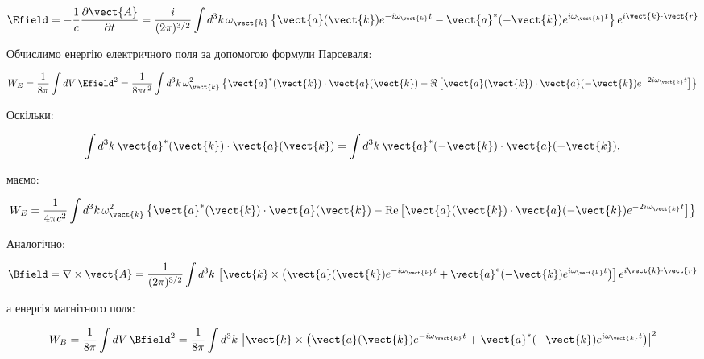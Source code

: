 \begin{equation}
\Efield = -\frac{1}{c} \frac{\partial \vect{A}}{\partial t} = \frac{i}{(2\pi)^{3/2}} \int d^3k \, \omega_{\vect{k}} \left\{ \vect{a}(\vect{k})
e^{-i\omega_{\vect{k}} t} - \vect{a}^*(-\vect{k}) e^{i\omega_{\vect{k}} t} \right\} e^{i\vect{k} \cdot \vect{r}}
\label{eq:E_field_fourier}
\end{equation}

Обчислимо енергію електричного поля за допомогою формули Парсеваля:

\begin{equation}
W_E = \frac{1}{8\pi} \int dV \, \Efield^2 = \frac{1}{8\pi c^2} \int d^3k \, \omega_{\vect{k}}^2 \left\{ \vect{a}^*(\vect{k}) \cdot \vect{a}(\vect{k}) -
\Re \left[ \vect{a}(\vect{k}) \cdot \vect{a}(-\vect{k}) e^{-2i\omega_{\vect{k}} t} \right] \right\}
\label{eq:W_E}
\end{equation}

Оскільки:

\begin{equation*}
\int d^3k \, \vect{a}^*(\vect{k}) \cdot \vect{a}(\vect{k}) = \int d^3k \, \vect{a}^*(-\vect{k}) \cdot \vect{a}(-\vect{k}),
\end{equation*}

маємо:

\begin{equation}
W_E = \frac{1}{4\pi c^2} \int d^3k \, \omega_{\vect{k}}^2 \left\{ \vect{a}^*(\vect{k}) \cdot \vect{a}(\vect{k}) - \text{Re} \left[ \vect{a}(\vect{k})
\cdot \vect{a}(-\vect{k}) e^{-2i\omega_{\vect{k}} t} \right] \right\}
\label{eq:W_E_final}
\end{equation}

Аналогічно:

\begin{equation}
\Bfield = \nabla \times \vect{A} = \frac{1}{(2\pi)^{3/2}} \int d^3k \, \left[ \vect{k} \times \left( \vect{a}(\vect{k}) e^{-i\omega_{\vect{k}} t} +
\vect{a}^*(-\vect{k}) e^{i\omega_{\vect{k}} t} \right) \right] e^{i\vect{k} \cdot \vect{r}}
\label{eq:B_field_fourier}
\end{equation}

а енергія магнітного поля:

\begin{equation}
W_B = \frac{1}{8\pi} \int dV \, \Bfield^2 = \frac{1}{8\pi} \int d^3k \, \left| \vect{k} \times \left( \vect{a}(\vect{k}) e^{-i\omega_{\vect{k}} t} +
\vect{a}^*(-\vect{k}) e^{i\omega_{\vect{k}} t} \right) \right|^2
\label{eq:W_B}
\end{equation}


